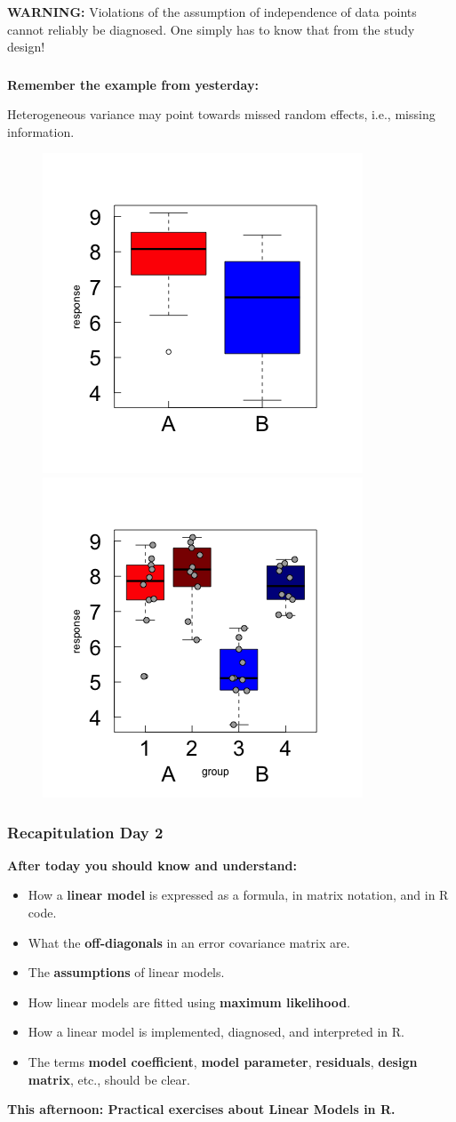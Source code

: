 \documentclass{beamer}
\begin{document}
\begin{frame}
    \frametitle{}
    \textbf{WARNING:} Violations of the assumption of independence of data points cannot reliably be diagnosed. One simply has to know that from the study design!
\end{frame}

\begin{frame}
    \frametitle{}
    \textbf{Remember the example from yesterday:}
    
    Heterogeneous variance may point towards missed random effects, i.e., missing information.

    \begin{figure}
        \centering
        \includegraphics[width=0.4\linewidth]{lectures/day_2_LM_refresh_I/figures/unnamed-chunk-43-1.png}
        \includegraphics[width=0.4\linewidth]{lectures/day_2_LM_refresh_I/figures/unnamed-chunk-44-1.png}
    \end{figure}
\end{frame}

\begin{frame}
    \frametitle{Recapitulation Day 2}
    \textbf{After today you should know and understand:}
    \begin{itemize}
        \item How a \textbf{linear model} is expressed as a formula, in matrix notation, and in R code.
        \item What the \textbf{off-diagonals} in an error covariance matrix are.
        \item The \textbf{assumptions} of linear models.
        \item How linear models are fitted using \textbf{maximum likelihood}.
        \item How a linear model is implemented, diagnosed, and interpreted in R.
        \item The terms \textbf{model coefficient}, \textbf{model parameter}, \textbf{residuals}, \textbf{design matrix}, etc., should be clear.
    \end{itemize}
    \vspace{1cm}
    \textbf{This afternoon: Practical exercises about Linear Models in R.}
\end{frame}
\end{document}
